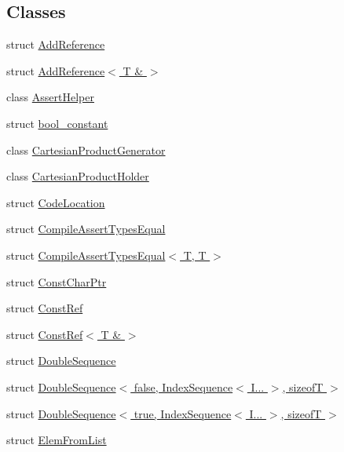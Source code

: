 \subsection*{Classes}
\begin{DoxyCompactItemize}
\item 
struct \hyperlink{structtesting_1_1internal_1_1AddReference}{Add\+Reference}
\item 
struct \hyperlink{structtesting_1_1internal_1_1AddReference_3_01T_01_6_01_4}{Add\+Reference$<$ T \& $>$}
\item 
class \hyperlink{classtesting_1_1internal_1_1AssertHelper}{Assert\+Helper}
\item 
struct \hyperlink{structtesting_1_1internal_1_1bool__constant}{bool\+\_\+constant}
\item 
class \hyperlink{classtesting_1_1internal_1_1CartesianProductGenerator}{Cartesian\+Product\+Generator}
\item 
class \hyperlink{classtesting_1_1internal_1_1CartesianProductHolder}{Cartesian\+Product\+Holder}
\item 
struct \hyperlink{structtesting_1_1internal_1_1CodeLocation}{Code\+Location}
\item 
struct \hyperlink{structtesting_1_1internal_1_1CompileAssertTypesEqual}{Compile\+Assert\+Types\+Equal}
\item 
struct \hyperlink{structtesting_1_1internal_1_1CompileAssertTypesEqual_3_01T_00_01T_01_4}{Compile\+Assert\+Types\+Equal$<$ T, T $>$}
\item 
struct \hyperlink{structtesting_1_1internal_1_1ConstCharPtr}{Const\+Char\+Ptr}
\item 
struct \hyperlink{structtesting_1_1internal_1_1ConstRef}{Const\+Ref}
\item 
struct \hyperlink{structtesting_1_1internal_1_1ConstRef_3_01T_01_6_01_4}{Const\+Ref$<$ T \& $>$}
\item 
struct \hyperlink{structtesting_1_1internal_1_1DoubleSequence}{Double\+Sequence}
\item 
struct \hyperlink{structtesting_1_1internal_1_1DoubleSequence_3_01false_00_01IndexSequence_3_01I_8_8_8_01_4_00_01sizeofT_01_4}{Double\+Sequence$<$ false, Index\+Sequence$<$ I... $>$, sizeof\+T $>$}
\item 
struct \hyperlink{structtesting_1_1internal_1_1DoubleSequence_3_01true_00_01IndexSequence_3_01I_8_8_8_01_4_00_01sizeofT_01_4}{Double\+Sequence$<$ true, Index\+Sequence$<$ I... $>$, sizeof\+T $>$}
\item 
struct \hyperlink{structtesting_1_1internal_1_1ElemFromList}{Elem\+From\+List}

\end{DoxyCompactItemize}
